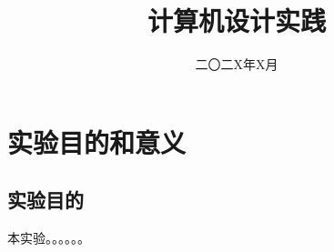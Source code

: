 \documentclass[forprint]{cpu}
\begin{document}


\title{计算机设计实践} %
\author{} %
\Csupervisor{\quad} %
\CstudentNum{} %
\Cmajor{} %
\date{二〇二X年X月} %


\maketitle
\frontmatter
{}              %


\tableofcontents
\thispagestyle{empty}				%




\mainmatter %
\pagestyle{plain}%
\baselineskip=23pt  %



\chapter{实验目的和意义}
 
 \section{实验目的}

 \begin{description}

\item 本实验。。。。。。


\end{description}
%
\end{document}
